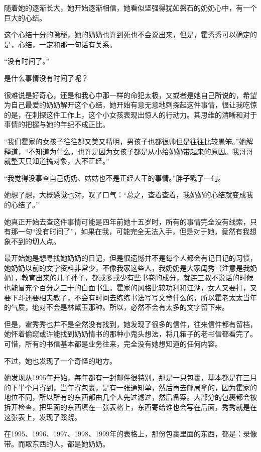 随着她的逐渐长大，她开始逐渐相信，她看似坚强得犹如磐石的奶奶心中，有一个巨大的心结。

这个心结十分的隐秘，她的奶奶也许到死也不会说出来，但是，霍秀秀可以确定的是，心结，一定和那一句话有关系。

“没有时间了。”

是什么事情没有时间了呢？

很难说是好奇心，还是和我心中那一样的命犯太极，又或者是她自己所说的，希望为自己最爱的奶奶解开这个心结，她开始有意无意地刺探起这件事情，很让我吃惊的是，在刺探这件工作上，这个小女孩表现出惊人的行动力。其思维的清晰和对于事情的把握与她的年纪不成正比。

“我们霍家的女孩子往往都又美又精明，男孩子也都很帅但是往往比较愚笨。”她解释道，“不知道为什么，也许是因为女孩子都是从小给奶奶带起来的原因。我哥哥就整天只知道搞对象，大不正经。”

“我觉得没事查自己奶奶、姑姑也不是正经人干的事情。”胖子戳了一句。

她想了想，大概感觉也对，叹了口气：“总之，查着查着，我奶奶的心结就变成我的心结了。”

她真正开始去查这件事情可能是四年前她十五岁时，所有的事情完全没有线索，只有那一句“没有时间了”，如果在我，可能完全无法入手，但是对于她，竟然有我想象不到的切人点。

最开始她是想寻找她奶奶的日记，但是很遗憾并不是每个人都会有记日记的习惯，她奶奶以前的文字资料非常少，不像我家这些人，我奶奶是大家闺秀（注意是我奶奶），教育出来的儿子孙子，都或多或少有些书卷的成分，就连三叔不说话的时候也能冒充个百分之三十的白面书生。霍家的风格比较功利和江湖，女人又要打，又要下斗还要相夫教子，不会有时间去练练书法写写文章什么的，所以霍老太太当年的气质，绝对不会是林黛玉那种。所以，必然不会有太多的文字留下来。

但是，霍秀秀也并不是全然没有找到，她发现了很多的信件，往来信件都有留档，她怀着偷窥或许能找到奶奶情书的那种小鬼头想法，将几箱子的老书信都看完了。可惜，所有的书信基本都是业务往来，完全没有她想知道的任何内容。

不过，她也发现了一个奇怪的地方。

她发现从1995年开始，每年都有一封邮件很特别，那是一只包裹，基本都是在三月的下半个月寄到，当年寄包裹，是有一张通知单，然后再去邮局拿的，因为霍家的地位不同，所以所有的东西都由几个人先过滤过，然后备案。大部分的包裹都会被拆开检查，把里面的东西填在一张表格上，东西寄给谁也会写在后面，秀秀就是在这张表上，发现了蹊跷。

在1995、1996、1997、1998、1999年的表格上，那份包裹里面的东西，都是：录像带。而取东西的人，都是她奶奶。

